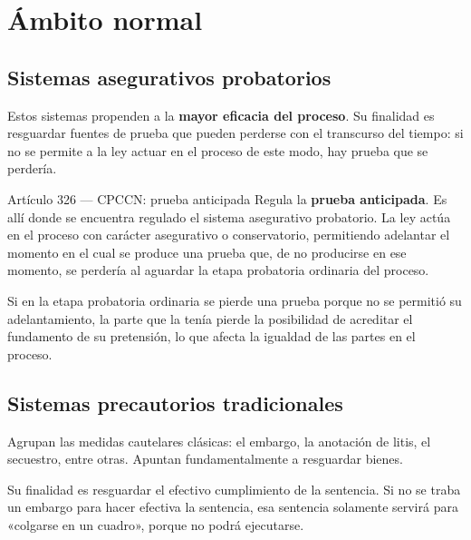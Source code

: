 \documentclass[12pt,oneside]{book}
\begin{document}

\section{Ámbito normal}

\subsection{Sistemas asegurativos probatorios}

Estos sistemas propenden a la \textbf{mayor eficacia del proceso}. Su finalidad es resguardar fuentes de prueba que pueden perderse con el transcurso del tiempo: si no se permite a la ley actuar en el proceso de este modo, hay prueba que se perdería.

\begin{normativa}{Artículo 326 --- CPCCN: prueba anticipada}
Regula la \textbf{prueba anticipada}. Es allí donde se encuentra regulado el sistema asegurativo probatorio. La ley actúa en el proceso con carácter asegurativo o conservatorio, permitiendo adelantar el momento en el cual se produce una prueba que, de no producirse en ese momento, se perdería al aguardar la etapa probatoria ordinaria del proceso.
\end{normativa}

Si en la etapa probatoria ordinaria se pierde una prueba porque no se permitió su adelantamiento, la parte que la tenía pierde la posibilidad de acreditar el fundamento de su pretensión, lo que afecta la igualdad de las partes en el proceso.

\subsection{Sistemas precautorios tradicionales}

Agrupan las medidas cautelares clásicas: el embargo, la anotación de litis, el secuestro, entre otras. Apuntan fundamentalmente a resguardar bienes.

\begin{important}
Su finalidad es resguardar el efectivo cumplimiento de la sentencia. Si no se traba un embargo para hacer efectiva la sentencia, esa sentencia solamente servirá para «colgarse en un cuadro», porque no podrá ejecutarse.
\end{important}
\end{document}
